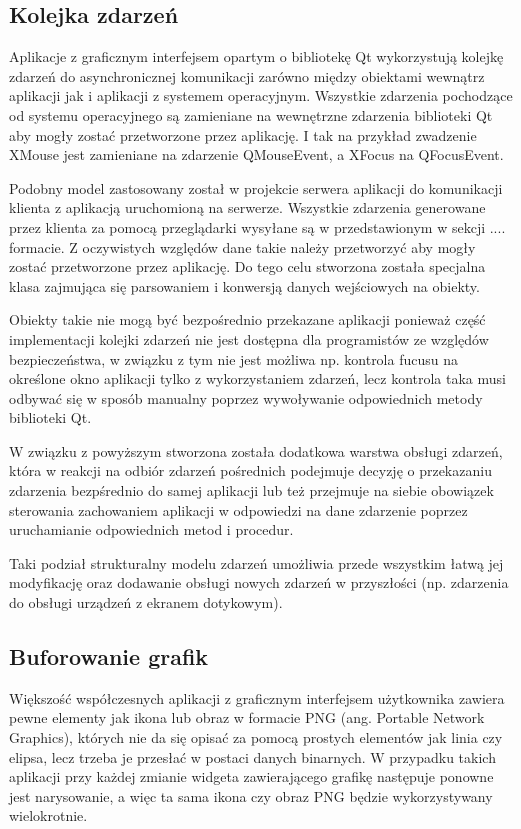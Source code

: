 \subsection{Kolejka zdarzeń}
Aplikacje z graficznym interfejsem opartym o bibliotekę Qt wykorzystują kolejkę zdarzeń do asynchronicznej komunikacji zarówno między obiektami wewnątrz aplikacji jak i aplikacji z systemem operacyjnym. Wszystkie zdarzenia pochodzące od systemu operacyjnego są zamieniane na wewnętrzne zdarzenia biblioteki Qt aby mogły zostać przetworzone przez aplikację. I tak na przykład zwadzenie XMouse jest zamieniane na zdarzenie QMouseEvent, a XFocus na QFocusEvent. 

Podobny model zastosowany został w projekcie serwera aplikacji do komunikacji klienta z aplikacją uruchomioną na serwerze. Wszystkie zdarzenia generowane przez klienta za pomocą przeglądarki wysyłane są w przedstawionym w sekcji .... formacie. Z oczywistych względów dane takie należy przetworzyć aby mogły zostać przetworzone przez aplikację. Do tego celu stworzona została specjalna klasa zajmująca się parsowaniem i konwersją danych wejściowych na obiekty. 

Obiekty takie nie mogą być bezpośrednio przekazane aplikacji ponieważ część implementacji kolejki zdarzeń nie jest dostępna dla programistów ze względów bezpieczeństwa, w związku z tym nie jest możliwa np. kontrola fucusu na określone okno aplikacji tylko z wykorzystaniem zdarzeń, lecz kontrola taka musi odbywać się w sposób manualny poprzez wywoływanie odpowiednich metody biblioteki Qt.

W związku z powyższym stworzona została dodatkowa warstwa obsługi zdarzeń, która w reakcji na odbiór zdarzeń pośrednich podejmuje decyzję o przekazaniu zdarzenia bezpśrednio do samej aplikacji lub też przejmuje na siebie obowiązek sterowania zachowaniem aplikacji w odpowiedzi na dane zdarzenie poprzez uruchamianie odpowiednich metod i procedur. 

Taki podział strukturalny modelu zdarzeń umożliwia przede wszystkim łatwą jej modyfikację oraz dodawanie obsługi nowych zdarzeń w przyszłości (np. zdarzenia do obsługi urządzeń z ekranem dotykowym).

\subsection{Buforowanie grafik}
Większość współczesnych aplikacji z graficznym interfejsem użytkownika zawiera pewne elementy jak ikona lub obraz w formacie PNG (ang. Portable Network Graphics), których nie da się opisać za pomocą prostych elementów jak linia czy elipsa, lecz trzeba je przesłać w postaci danych binarnych. W przypadku takich aplikacji przy każdej zmianie widgeta zawierającego grafikę następuje ponowne jest narysowanie, a więc ta sama ikona czy obraz PNG będzie wykorzystywany wielokrotnie. 


